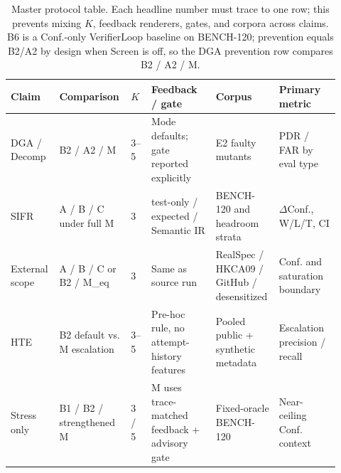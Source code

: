 \begin{table}[t]
  \centering
  \caption{Master protocol table.
    Each headline number must trace to one row; this prevents mixing $K$,
    feedback renderers, gates, and corpora across claims.
    B6 is a Conf.-only VerifierLoop baseline on BENCH-120; prevention equals
    B2/A2 by design when Screen is off, so the DGA prevention row compares
    B2 / A2 / M.}
  \label{tab:master-protocol}
  \footnotesize
  \renewcommand{\arraystretch}{1.08}
  \begin{tabular}{@{}p{0.12\linewidth}p{0.19\linewidth}p{0.06\linewidth}p{0.19\linewidth}p{0.18\linewidth}p{0.18\linewidth}@{}}
    \toprule
    Claim & Comparison & $K$ & Feedback / gate & Corpus & Primary metric \\
    \midrule
    DGA / Decomp
      & B2 / A2 / M
      & 3--5
      & Mode defaults; gate reported explicitly
      & E2 faulty mutants
      & PDR / FAR by eval type \\
    SIFR
      & A / B / C under full M
      & 3
      & test-only / expected / Semantic IR
      & BENCH-120 and headroom strata
      & $\Delta$Conf., W/L/T, CI \\
    External scope
      & A / B / C or B2 / M\_eq
      & 3
      & Same as source run
      & RealSpec / HKCA09 / GitHub / desensitized
      & Conf. and saturation boundary \\
    HTE
      & B2 default vs. M escalation
      & 3--5
      & Pre-hoc rule, no attempt-history features
      & Pooled public + synthetic metadata
      & Escalation precision / recall \\
    Stress only
      & B1 / B2 / strengthened M
      & 3 / 5
      & M uses trace-matched feedback + advisory gate
      & Fixed-oracle BENCH-120
      & Near-ceiling Conf. context \\
    \bottomrule
  \end{tabular}
\end{table}
